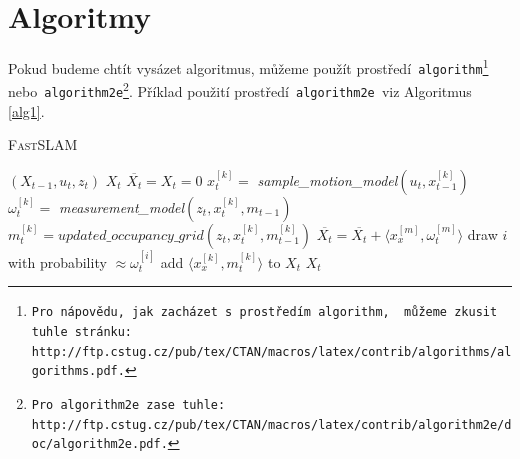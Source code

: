 \documentclass[11pt, a4paper]{article}
\begin{document}
\section{Algoritmy}
\label{alg}
Pokud budeme chtít vysázet algoritmus, můžeme použít prostředí\texttt{ algorithm\footnote{Pro nápovědu, jak zacházet s prostředím\texttt{ algorithm, } můžeme zkusit tuhle stránku:\\ http://ftp.cstug.cz/pub/tex/CTAN/macros/latex/contrib/algorithms/algorithms.pdf.} }nebo\texttt{ algorithm2e\footnote{Pro\texttt{ algorithm2e }zase tuhle: http://ftp.cstug.cz/pub/tex/CTAN/macros/latex/contrib/algorithm2e/doc/algorithm2e.pdf.}}.\linebreak
Příklad použití prostředí\texttt{ algorithm2e }viz Algoritmus \ref{alg1}.\\
%
\begin{algorithm}
\caption{\textsc{Fast}SLAM}
\label{alg1}
\SetInd{1em}{1em}
\SetNlSkip{-1.33em}
\begin{algorithmic}[1]
\REQUIRE $(X_{t-1},u_t,z_t)$
\ENSURE $X_t$
\BlankLine
\STATE $\overline{X_t} = X_t = 0$
\STATE $x_{t}^{[k]} =$ \emph{sample\_motion\_model}$(u_t,x_{t-1}^{[k]})$
\STATE $\omega_{t}^{[k]} =$ \emph{measurement\_model}$(z_t,x_{t}^{[k]},m_{t-1})$
\STATE $m_{t}^{[k]} = updated\_occupancy\_grid(z_t,x_{t}^{[k]},m_{t-1}^{[k]})$
\STATE $\overline{X_t} = \overline{X_t}+\langle x_{x}^{[m]}, \omega_{t}^{[m]}\rangle$
\ENDFOR
{}
\STATE draw $i$ with probability $\approx \omega_{t}^{[i]}$
\STATE add $\langle x_{x}^{[k]},m_{t}^{[k]} \rangle$ to $X_t$
\ENDFOR
\RETURN $X_t$
\end{algorithmic}
\end{algorithm}
%
\end{document}
